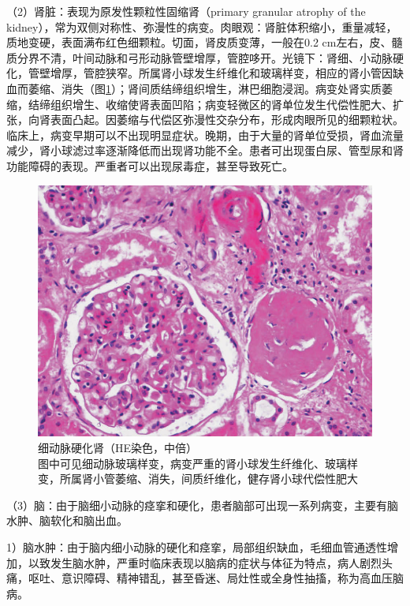 （2）肾脏：表现为原发性颗粒性固缩肾（primary granular atrophy of the
kidney），常为双侧对称性、弥漫性的病变。肉眼观：肾脏体积缩小，重量减轻，质地变硬，表面满布红色细颗粒。切面，肾皮质变薄，一般在0.2
cm左右，皮、髓质分界不清，叶间动脉和弓形动脉管壁增厚，管腔哆开。光镜下：肾细、小动脉硬化，管壁增厚，管腔狭窄。所属肾小球发生纤维化和玻璃样变，相应的肾小管因缺血而萎缩、消失（图\ref{fig6-8}）；肾间质结缔组织增生，淋巴细胞浸润。病变处肾实质萎缩，结缔组织增生、收缩使肾表面凹陷；病变轻微区的肾单位发生代偿性肥大、扩张，向肾表面凸起。因萎缩与代偿区弥漫性交杂分布，形成肉眼所见的细颗粒状。临床上，病变早期可以不出现明显症状。晚期，由于大量的肾单位受损，肾血流量减少，肾小球滤过率逐渐降低而出现肾功能不全。患者可出现蛋白尿、管型尿和肾功能障碍的表现。严重者可以出现尿毒症，甚至导致死亡。

\begin{figure}[!htbp]
    \centering
    \includegraphics{./images/Image00100.jpg}
    \captionsetup{justification=centering}
    \caption{细动脉硬化肾（HE染色，中倍）\\{\small 图中可见细动脉玻璃样变，病变严重的肾小球发生纤维化、玻璃样变，所属肾小管萎缩、消失，间质纤维化，健存肾小球代偿性肥大}}
    \label{fig6-8}
\end{figure}



（3）脑：由于脑细小动脉的痉挛和硬化，患者脑部可出现一系列病变，主要有脑水肿、脑软化和脑出血。

1）脑水肿：由于脑内细小动脉的硬化和痉挛，局部组织缺血，毛细血管通透性增加，以致发生脑水肿，严重时临床表现以脑病的症状与体征为特点，病人剧烈头痛，呕吐、意识障碍、精神错乱，甚至昏迷、局灶性或全身性抽搐，称为高血压脑病。

